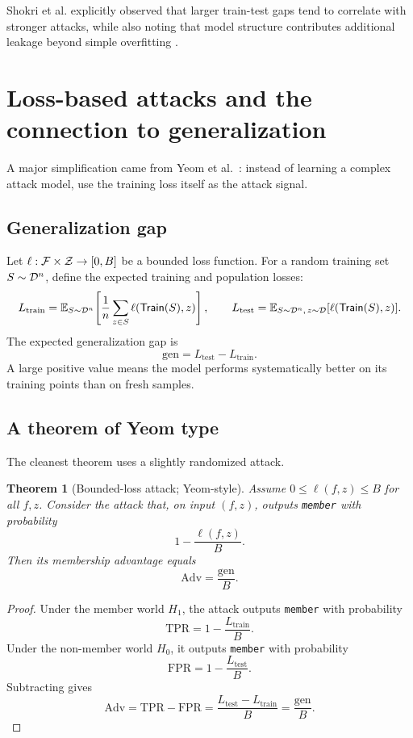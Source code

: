 \documentclass[11pt]{article}
\newtheorem{theorem}{Theorem}[section]
\theoremstyle{definition}
\newcommand{\E}{\mathbb{E}}
\newcommand{\1}{\mathbf{1}}
\newcommand{\Train}{\mathsf{Train}}
\newcommand{\Loss}{\ell}
\newcommand{\TPR}{\mathrm{TPR}}
\newcommand{\FPR}{\mathrm{FPR}}
\newcommand{\Adv}{\mathrm{Adv}}
\begin{document}
Shokri et al. explicitly observed that larger train-test gaps tend to correlate with stronger attacks, while also noting that model structure contributes additional leakage beyond simple overfitting \cite{shokri2017}.

\section{Loss-based attacks and the connection to generalization}

A major simplification came from Yeom et al.~\cite{yeom2018}: instead of learning a complex attack model, use the training loss itself as the attack signal.

\subsection{Generalization gap}

Let $\Loss : \cF \times \cZ \to [0,B]$ be a bounded loss function. For a random training set $S \sim {\cal D}^n$, define the expected training and population losses:
\[
L_{\mathrm{train}} = \E_{S \sim \cD^n}\!\left[\frac{1}{n}\sum_{z \in S} \Loss(\Train(S),z)\right],
\qquad
L_{\mathrm{test}} = \E_{S \sim \cD^n,\, z \sim \cD}[\Loss(\Train(S),z)].
\]
The expected generalization gap is
\[
\mathrm{gen} = L_{\mathrm{test}} - L_{\mathrm{train}}.
\]
A large positive value means the model performs systematically better on its training points than on fresh samples.

\subsection{A theorem of Yeom type}

The cleanest theorem uses a slightly randomized attack.

\begin{theorem}[Bounded-loss attack; Yeom-style]\label{thm:yeom-bounded}
Assume $0 \le \Loss(f,z) \le B$ for all $f,z$. Consider the attack that, on input $(f,z)$, outputs \texttt{member} with probability
\[
1 - \frac{\Loss(f,z)}{B}.
\]
Then its membership advantage equals
\[
\Adv = \frac{\mathrm{gen}}{B}.
\]
\end{theorem}

\begin{proof}
Under the member world $H_1$, the attack outputs \texttt{member} with probability
\[
\TPR = 1 - \frac{L_{\mathrm{train}}}{B}.
\]
Under the non-member world $H_0$, it outputs \texttt{member} with probability
\[
\FPR = 1 - \frac{L_{\mathrm{test}}}{B}.
\]
Subtracting gives
\[
\Adv = \TPR - \FPR = \frac{L_{\mathrm{test}} - L_{\mathrm{train}}}{B} = \frac{\mathrm{gen}}{B}.
\]
\end{proof}
\end{document}
